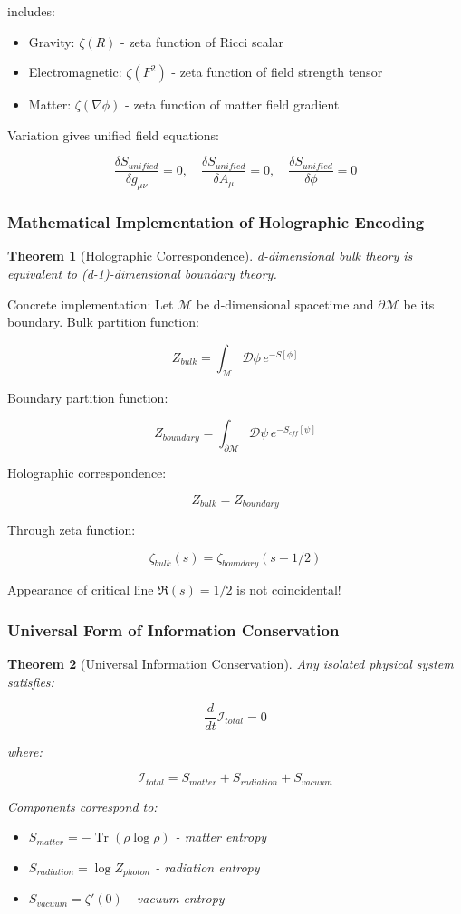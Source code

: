 \documentclass[12pt,a4paper]{article}
\newtheorem{theorem}{Theorem}[section]
\DeclareMathOperator{\Tr}{Tr}
\begin{document}
includes:
\begin{itemize}
\item Gravity: $\zeta(R)$ - zeta function of Ricci scalar
\item Electromagnetic: $\zeta(F^2)$ - zeta function of field strength tensor
\item Matter: $\zeta(\nabla\phi)$ - zeta function of matter field gradient
\end{itemize}

Variation gives unified field equations:

$$\frac{\delta S_{unified}}{\delta g_{\mu\nu}} = 0, \quad \frac{\delta S_{unified}}{\delta A_\mu} = 0, \quad \frac{\delta S_{unified}}{\delta \phi} = 0$$

\subsubsection{Mathematical Implementation of Holographic Encoding}

\begin{theorem}[Holographic Correspondence]
d-dimensional bulk theory is equivalent to (d-1)-dimensional boundary theory.
\end{theorem}

Concrete implementation: Let $\mathcal{M}$ be d-dimensional spacetime and $\partial\mathcal{M}$ be its boundary. Bulk partition function:

$$Z_{bulk} = \int_{\mathcal{M}} \mathcal{D}\phi \, e^{-S[\phi]}$$

Boundary partition function:

$$Z_{boundary} = \int_{\partial\mathcal{M}} \mathcal{D}\psi \, e^{-S_{eff}[\psi]}$$

Holographic correspondence:

$$Z_{bulk} = Z_{boundary}$$

Through zeta function:

$$\zeta_{bulk}(s) = \zeta_{boundary}(s-1/2)$$

Appearance of critical line $\Re(s) = 1/2$ is not coincidental!

\subsubsection{Universal Form of Information Conservation}

\begin{theorem}[Universal Information Conservation]
Any isolated physical system satisfies:

$$\frac{d}{dt}\mathcal{I}_{total} = 0$$

where:

$$\mathcal{I}_{total} = S_{matter} + S_{radiation} + S_{vacuum}$$

Components correspond to:
\begin{itemize}
\item $S_{matter} = -\Tr(\rho \log \rho)$ - matter entropy
\item $S_{radiation} = \log Z_{photon}$ - radiation entropy
\item $S_{vacuum} = \zeta'(0)$ - vacuum entropy
\end{itemize}
\end{theorem}
\end{document}
